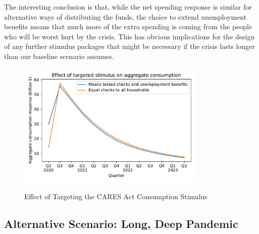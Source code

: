 \documentclass[titlepage,a4paper]{\econtex}
\begin{document}
The interesting conclusion is that, while the net spending response is similar for alternative ways of distributing the funds, the choice to extend unemployment benefits means that much more of the extra spending is coming from the people who will be worst hurt by the crisis.  This has obvious implications for the design of any further stimulus packages that might be necessary if the crisis lasts longer than our baseline scenario assumes.

\begin{figure}
  \centering
  \caption{Effect of Targeting the CARES Act Consumption Stimulus}
  \label{EffectTargeting}
  { \includegraphics[width=0.8\textwidth]{./Figures/EffectTargeting}}
\end{figure}


\subsection{Alternative Scenario: Long, Deep Pandemic} \label{sec:longPandemic}
\end{document}
